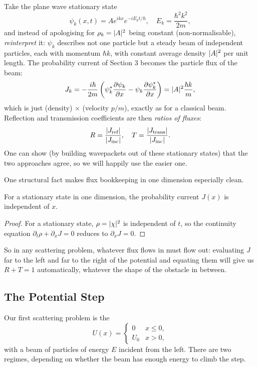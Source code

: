 \documentclass[a4paper]{scrartcl}
\begin{document}
Take the plane wave stationary state
$$
\psi_k(x, t) = A e^{ikx} e^{-i E_k t/\hbar}, \quad E_k = \frac{\hbar^2 k^2}{2m},
$$
and instead of apologising for $\rho_k = \lvert A\rvert^2$ being constant (non-normalisable), \emph{reinterpret} it: $\psi_k$ describes not one particle but a steady beam of independent particles, each with momentum $\hbar k$, with constant average density $\lvert A\rvert^2$ per unit length. The probability current of Section 3 becomes the particle flux of the beam:
$$
J_k = -\frac{i \hbar}{2m}\left( \psi_k^* \frac{\partial \psi_k}{\partial x} - \psi_k \frac{\partial \psi_k^*}{\partial x} \right) = \lvert A\rvert^2 \frac{\hbar k}{m},
$$
which is just (density) $\times$ (velocity $p/m$), exactly as for a classical beam. Reflection and transmission coefficients are then \emph{ratios of fluxes}:
$$
R = \frac{\lvert J_{\text{ref}}\rvert}{\lvert J_{\text{inc}}\rvert}, \quad T = \frac{\lvert J_{\text{trans}}\rvert}{\lvert J_{\text{inc}}\rvert}.
$$
One can show (by building wavepackets out of these stationary states) that the two approaches agree, so we will happily use the easier one.

One structural fact makes flux bookkeeping in one dimension especially clean.

\begin{proposition}
    For a stationary state in one dimension, the probability current $J(x)$ is independent of $x$.
\end{proposition}
\begin{proof}
    For a stationary state, $\rho = \lvert\chi\rvert^2$ is independent of $t$, so the continuity equation $\partial_t \rho + \partial_x J = 0$ reduces to $\partial_x J = 0$.
\end{proof}

So in any scattering problem, whatever flux flows in must flow out: evaluating $J$ far to the left and far to the right of the potential and equating them will give us $R + T = 1$ automatically, whatever the shape of the obstacle in between.

\subsection{The Potential Step}

Our first scattering problem is the 
$$
U(x) = \begin{cases}
    0 & x \leq 0, \\
    U_0 & x > 0,
\end{cases}
$$
with a beam of particles of energy $E$ incident from the left. There are two regimes, depending on whether the beam has enough energy to climb the step.
\end{document}
